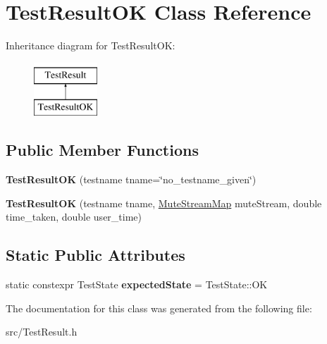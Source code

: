 \hypertarget{class_test_result_o_k}{\section{Test\-Result\-O\-K Class Reference}
\label{class_test_result_o_k}
}
Inheritance diagram for Test\-Result\-O\-K\-:\begin{figure}[H]
\begin{center}
\leavevmode
\includegraphics[height=2.000000cm]{class_test_result_o_k}
\end{center}
\end{figure}
\subsection*{Public Member Functions}
\begin{DoxyCompactItemize}
\item 
\hypertarget{class_test_result_o_k_ae6784ee29cf9369af9dfb2ac5e13c212}{{\bfseries Test\-Result\-O\-K} (testname tname=\char`\"{}no\-\_\-testname\-\_\-given\char`\"{})}\label{class_test_result_o_k_ae6784ee29cf9369af9dfb2ac5e13c212}

\item 
\hypertarget{class_test_result_o_k_a8c46f19eb2273d65fb44cdfd0fbbf940}{{\bfseries Test\-Result\-O\-K} (testname tname, \hyperlink{class_mute_stream_map}{Mute\-Stream\-Map} mute\-Stream, double time\-\_\-taken, double user\-\_\-time)}\label{class_test_result_o_k_a8c46f19eb2273d65fb44cdfd0fbbf940}

\end{DoxyCompactItemize}
\subsection*{Static Public Attributes}
\begin{DoxyCompactItemize}
\item 
\hypertarget{class_test_result_o_k_a7b68adec43f5254797d3e84d3fc745ff}{static constexpr Test\-State {\bfseries expected\-State} = Test\-State\-::\-O\-K}\label{class_test_result_o_k_a7b68adec43f5254797d3e84d3fc745ff}

\end{DoxyCompactItemize}


The documentation for this class was generated from the following file\-:\begin{DoxyCompactItemize}
\item 
src/Test\-Result.\-h\end{DoxyCompactItemize}
